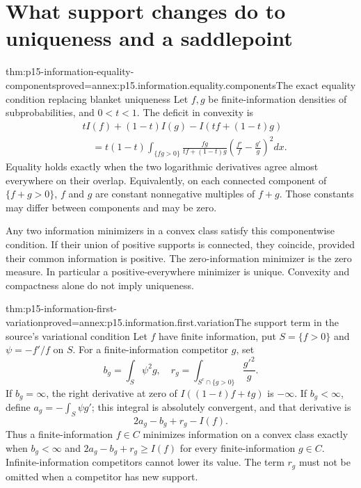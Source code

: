 \section{What support changes do to uniqueness and a saddlepoint}
\label{sec:p15-information-support-correction}

\begin{hbtheorem}{thm:p15-information-equality-components}{proved=annex:p15.information.equality.components}{The exact equality condition replacing blanket uniqueness}
Let \(f,g\) be finite-information densities of subprobabilities, and
\(0<t<1\). The deficit in convexity is
\[
\begin{split}
 &tI(f)+(1-t)I(g)-I(tf+(1-t)g)\\
 &\quad=t(1-t)\int_{\{fg>0\}}
 \frac{fg}{tf+(1-t)g}
       \left(\frac{f'}f-\frac{g'}g\right)^2dx .
\end{split}
\]
Equality holds exactly when the two logarithmic derivatives agree
almost everywhere on their overlap.
Equivalently, on each connected component of \(\{f+g>0\}\),
\(f\) and \(g\) are constant nonnegative multiples of \(f+g\).
Those constants may differ between components and may be zero.

Any two information minimizers in a convex class satisfy this
componentwise condition. If their union of positive supports is
connected, they coincide, provided their common information is positive.
The zero-information minimizer is the zero measure.
In particular a positive-everywhere minimizer is unique.
Convexity and compactness alone do not imply uniqueness.
\end{hbtheorem}

\begin{hbtheorem}{thm:p15-information-first-variation}{proved=annex:p15.information.first.variation}{The support term in the source's variational condition}
Let \(f\) have finite information, put \(S=\{f>0\}\) and
\(\psi=-f'/f\) on \(S\). For a finite-information competitor \(g\), set
\[
 b_g=\int_S\psi^2g,\quad
 r_g=\int_{S^c\cap\{g>0\}}\frac{g'^2}{g}.
\]
If \(b_g=\infty\), the right derivative at zero of
\(I((1-t)f+tg)\) is \(-\infty\).
If \(b_g<\infty\), define \(a_g=-\int_S\psi g'\); this integral
is absolutely convergent, and
that derivative is
\[
                    2a_g-b_g+r_g-I(f).
\]
Thus a finite-information \(f\in C\) minimizes information on a
convex class exactly when \(b_g<\infty\) and
\(2a_g-b_g+r_g\geq I(f)\) for every finite-information \(g\in C\).
Infinite-information competitors cannot lower its value.
The term \(r_g\) must not be omitted when a competitor has new support.
\end{hbtheorem}

